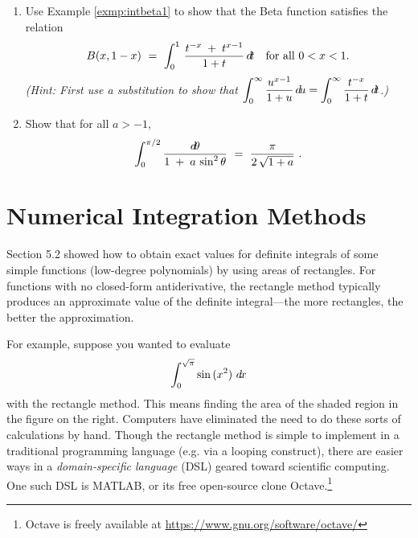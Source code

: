 {\begin{enumerate}[\bfseries 1.]
to show that for all $a > 0$,
\[
\int \frac{\dx}{\sqrt{a^2 + x^2}} ~=~ \ln\;\Abs{x + \sqrt{a^2 + x^2}\,} ~+~ C ~.
\]
 \item Use Example \ref{exmp:intbeta1} to show that the Beta function satisfies
  the relation
\[
B(x,1-x) ~=~ \int_0^1 \,\frac{t^{-x} \;+\; t^{x-1}}{1 + t}\,d\!t
\quad\text{for all $0 < x < 1$.}
\]
\emph{(Hint: First use a substitution to show that
$\displaystyle\int_0^{\infty} \dfrac{u^{x-1}}{1 + u}\,d\!u = 
 \displaystyle\int_0^{\infty} \dfrac{t^{-x}}{1 + t}\,d\!t$.)}
 \item Show that for all $a > -1$,
\[
\int_0^{\pi/2} \frac{d\!\theta}{1 \;+\; a\,\sin^2 \theta} ~=~ \frac{\pi}{2\,\sqrt{1+a}} ~.
\]
\end{enumerate}
}
\newpage
\section{Numerical Integration Methods}
Section 5.2 showed how to obtain exact values for definite integrals of some
simple functions (low-degree polynomials) by using areas of rectangles. For
functions with no closed-form antiderivative, the rectangle method typically
produces an approximate value of the definite integral---the more rectangles,
the better the approximation.

For example, suppose you wanted to evaluate
\[
\int_0^{\sqrt{\pi}} \sin\,(x^2)~d\!x
\]
with the rectangle method. This means finding the area of the shaded region in
the figure on the right. Computers have eliminated the need to do these sorts of
calculations by hand. Though the rectangle method is simple to implement in a
traditional programming language (e.g. via a looping construct), there are
easier ways in a \emph{domain-specific language} (DSL) geared toward scientific
computing. One such DSL is MATLAB\textsuperscript{\textregistered}, or its free
open-source clone Octave.\footnote{Octave is freely available at
\url{https://www.gnu.org/software/octave/}}

